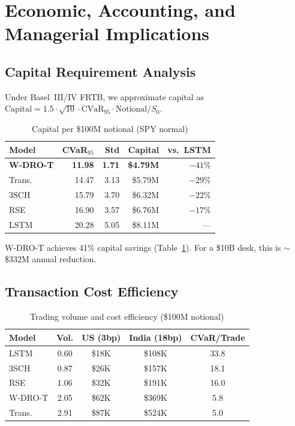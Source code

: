 \documentclass[11pt]{article}
\begin{document}
\section{Economic, Accounting, and Managerial Implications}
\label{sec:implications}

\subsection{Capital Requirement Analysis}

Under Basel~III/IV FRTB, we approximate capital as $\mathrm{Capital} = 1.5 \cdot \sqrt{10} \cdot \mathrm{CVaR}_{95} \cdot \mathrm{Notional}/S_0$.

\begin{table}[t]
\centering
\caption{Capital per \$100M notional (SPY normal)}
\label{tab:capital}
\small
\begin{tabular}{lrrrr}
\toprule
\textbf{Model} & \textbf{CVaR$_{95}$} & \textbf{Std} & \textbf{Capital} & \textbf{vs.\ LSTM} \\
\midrule
\textbf{W-DRO-T} & \textbf{11.98} & \textbf{1.71} & \textbf{\$4.79M} & $-41\%$ \\
Trans. & 14.47 & 3.13 & \$5.79M & $-29\%$ \\
3SCH & 15.79 & 3.70 & \$6.32M & $-22\%$ \\
RSE & 16.90 & 3.57 & \$6.76M & $-17\%$ \\
LSTM & 20.28 & 5.05 & \$8.11M & --- \\
\bottomrule
\end{tabular}
\end{table}

W-DRO-T achieves 41\% capital savings (Table~\ref{tab:capital}). For a \$10B desk, this is $\sim$\$332M annual reduction.

\subsection{Transaction Cost Efficiency}

\begin{table}[t]
\centering
\caption{Trading volume and cost efficiency (\$100M notional)}
\label{tab:tc}
\small
\begin{tabular}{lcccc}
\toprule
\textbf{Model} & \textbf{Vol.} & \textbf{US (3bp)} & \textbf{India (18bp)} & \textbf{CVaR/Trade} \\
\midrule
LSTM & 0.60 & \$18K & \$108K & 33.8 \\
3SCH & 0.87 & \$26K & \$157K & 18.1 \\
RSE & 1.06 & \$32K & \$191K & 16.0 \\
W-DRO-T & 2.05 & \$62K & \$369K & 5.8 \\
Trans. & 2.91 & \$87K & \$524K & 5.0 \\
\bottomrule
\end{tabular}
\end{table}
\end{document}
